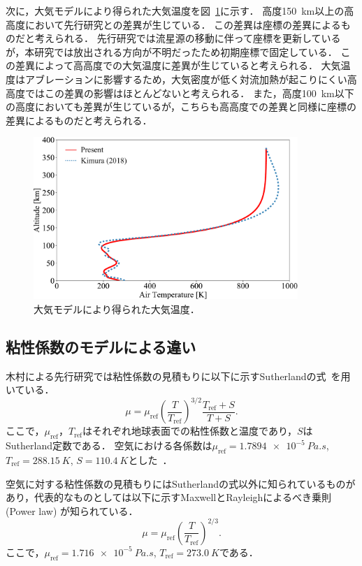 次に，大気モデルにより得られた大気温度を図~\ref{fig:trajectory-temp}に示す．
高度150~km以上の高高度において先行研究との差異が生じている．
この差異は座標の差異によるものだと考えられる．
先行研究では流星源の移動に伴って座標を更新しているが，本研究では放出される方向が不明だったため初期座標で固定している．
この差異によって高高度での大気温度に差異が生じていると考えられる．
大気温度はアブレーションに影響するため，大気密度が低く対流加熱が起こりにくい高高度ではこの差異の影響はほとんどないと考えられる．
また，高度100~km以下の高度においても差異が生じているが，こちらも高高度での差異と同様に座標の差異によるものだと考えられる．
\begin{figure}[p]
    \centering
    \includegraphics[width=10cm]{fig/trajectory/temp.pdf}
    \caption{大気モデルにより得られた大気温度．}
    \label{fig:trajectory-temp}
\end{figure}

\subsection{粘性係数のモデルによる違い}
木村による先行研究では粘性係数の見積もりに以下に示すSutherlandの式~\cite{sutherland1893lii}を用いている．
\begin{equation}
    \label{eq:sutherland}
    \mu = \mu_\mathrm{ref}\left(\dfrac{T}{T_\mathrm{ref}}\right)^{3/2}\dfrac{T_\mathrm{ref} + S}{T + S}.
\end{equation}
ここで，$\mu_\mathrm{ref}$，$T_\mathrm{ref}$はそれぞれ地球表面での粘性係数と温度であり，$S$はSutherland定数である．
空気における各係数は$\mu_\mathrm{ref} = \SI{1.7894e-5}{Pa.s}$,
$T_\mathrm{ref} = \SI{288.15}{K}$,
$S = \SI{110.4}{K}$とした~\cite{usstandard1976u}．

空気に対する粘性係数の見積もりにはSutherlandの式以外に知られているものがあり，代表的なものとしては以下に示すMaxwellとRayleighによるべき乗則 (Power law) が知られている．
\begin{equation}
    \mu = \mu_\mathrm{ref}\left(\dfrac{T}{T_\mathrm{ref}}\right)^{2/3}.
\end{equation}
ここで，$\mu_\mathrm{ref} = \SI{1.716e-5}{Pa.s}$, $T_\mathrm{ref} = \SI{273.0}{K}$である．

